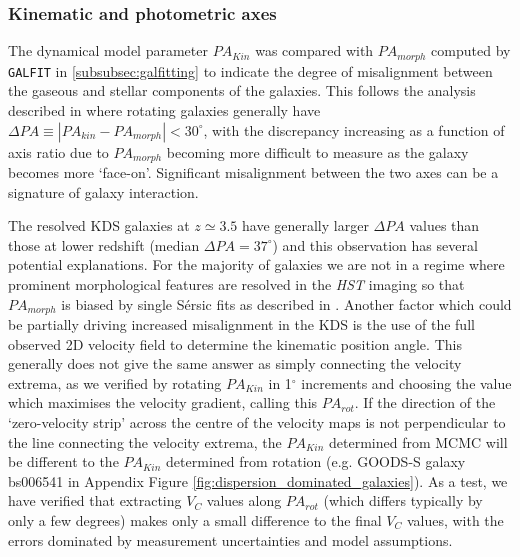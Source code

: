 \documentclass[fleqn,usenatbib]{mnras}
\newcommand{\Sers}{S\'{e}rsic }
\begin{document}
\subsubsection{Kinematic and photometric axes}\label{subsubsection:kin_and_phot}
The dynamical model parameter $PA_{Kin}$ was compared with $PA_{morph}$ computed by {\tt GALFIT} in \cref{subsubsec:galfitting} to indicate the degree of misalignment between the gaseous and stellar components of the galaxies.
This follows the analysis described in \citep[e.g.][]{Epinat2008,Epinat2012,Barrera-Ballesteros2014,Barrera-Ballesteros2015,Wisnioski2015,Harrison2017,Swinbank2017} where rotating galaxies generally have $\Delta PA \equiv |PA_{kin}-PA_{morph}| < 30^{\circ}$, with the discrepancy increasing as a function of axis ratio due to $PA_{morph}$ becoming more difficult to measure as the galaxy becomes more `face-on'.
Significant misalignment between the two axes can be a signature of galaxy interaction.

The resolved KDS galaxies at $z\simeq3.5$ have generally larger $\Delta PA$ values than those at lower redshift (median $\Delta PA = 37^{\circ}$) and this observation has several potential explanations.
For the majority of galaxies we are not in a regime where prominent morphological features are resolved in the {\em HST} imaging so that $PA_{morph}$ is biased by single \Sers fits as described in \cite{Rodrigues2017}.
Another factor which could be partially driving increased misalignment in the KDS is the use of the full observed 2D velocity field to determine the kinematic position angle.
This generally does not give the same answer as simply connecting the velocity extrema, as we verified by rotating $PA_{Kin}$ in 1$^{\circ}$ increments and choosing the value which maximises the velocity gradient, calling this $PA_{rot}$.
If the direction of the `zero-velocity strip' across the centre of the velocity maps is not perpendicular to the line connecting the velocity extrema, the $PA_{Kin}$ determined from MCMC will be different to the $PA_{Kin}$ determined from rotation (e.g. GOODS-S galaxy bs006541 in Appendix Figure \ref{fig:dispersion_dominated_galaxies}).
As a test, we have verified that extracting $V_{C}$ values along $PA_{rot}$ (which differs typically by only a few degrees) makes only a small difference to the final $V_{C}$ values, with the errors dominated by measurement uncertainties and model assumptions.
\end{document}
